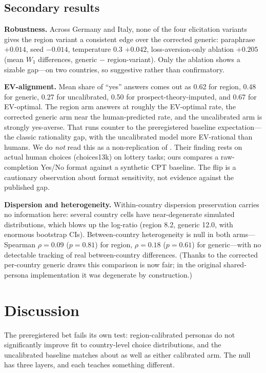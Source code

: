 \documentclass[10pt,letterpaper]{article}
\begin{document}
\subsection{Secondary results}

\textbf{Robustness.} Across Germany and Italy, none of the four elicitation
variants gives the region variant a consistent edge over the corrected
generic: paraphrase $+0.014$, seed $-0.014$, temperature 0.3 $+0.042$,
loss-aversion-only ablation $+0.205$ (mean $W_1$ differences,
generic $-$ region-variant). Only the ablation shows a sizable gap---on two
countries, so suggestive rather than confirmatory.

\textbf{EV-alignment.} Mean share of ``yes'' answers comes out as 0.62 for
region, 0.48 for generic, 0.27 for uncalibrated, 0.50 for
prospect-theory-imputed, and 0.67 for EV-optimal. The region arm answers at
roughly the EV-optimal rate, the corrected generic arm near the
human-predicted rate, and the uncalibrated arm is strongly yes-averse. That
runs counter to the preregistered baseline expectation---the classic
rationality gap, with the uncalibrated model more EV-rational than humans.
We do \textit{not} read this as a non-replication of \citet{liu2025}. Their
finding rests on actual human choices (choices13k) on lottery tasks; ours
compares a raw-completion Yes/No format against a synthetic CPT baseline.
The flip is a cautionary observation about format sensitivity, not evidence
against the published gap.

\textbf{Dispersion and heterogeneity.} Within-country dispersion
preservation carries no information here: several country cells have
near-degenerate simulated distributions, which blows up the log-ratio
(region 8.2, generic 12.0, with enormous bootstrap CIs). Between-country
heterogeneity is null in both arms---Spearman $\rho=0.09$ ($p=0.81$) for
region, $\rho=0.18$ ($p=0.61$) for generic---with no detectable tracking of
real between-country differences. (Thanks to the corrected per-country
generic draws this comparison is now fair; in the original shared-persona
implementation it was degenerate by construction.)

\section{Discussion}

The preregistered bet fails its own test: region-calibrated personas do
not significantly improve fit to country-level choice distributions, and
the uncalibrated baseline matches about as well as either calibrated arm.
The null has three layers, and each teaches something different.
\end{document}
